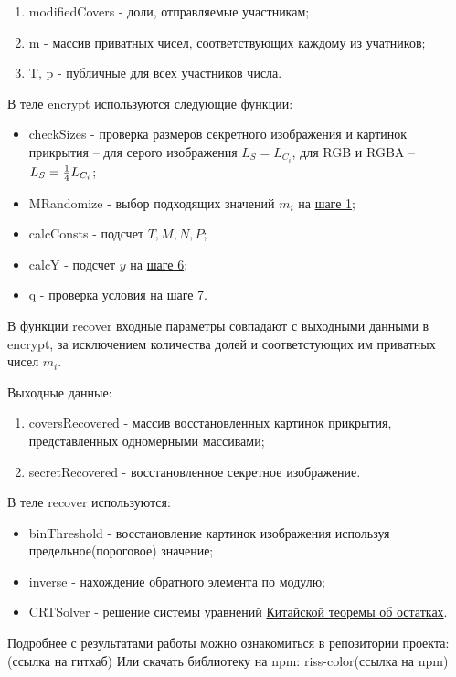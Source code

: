 \documentclass[a4paper,article,14pt]{extarticle}
\begin{document}
\begin{enumerate}[leftmargin=2cm]
    \item modifiedCovers - доли, отправляемые участникам;
    \item m - массив приватных чисел, соответствующих каждому из учатников;
    \item T, p - публичные для всех участников числа.
\end{enumerate}

В теле encrypt используются следующие функции: 
\begin{itemize}
    \setlength{\itemindent}{2em}
    \item checkSizes - проверка размеров секретного изображения и картинок прикрытия -- для серого изображения $L_S=L_{C_i}$,
    для RGB и RGBA -- $L_S={1\over 4}L_{C_i}$;
    \item MRandomize - выбор подходящих значений $m_i$ на \hyperlink{generation_alg}{шаге 1};
    \item calcConsts - подсчет $T, M, N, P$;
    \item calcY - подсчет $y$ на \hyperlink{step6_1}{шаге 6};
    \item q - проверка условия на \hyperlink{step6_1}{шаге 7}.
\end{itemize}

В функции recover входные параметры совпадают с выходными данными в encrypt, за исключением количества долей и соответстующих им 
приватных чисел $m_i$.

Выходные данные:
\begin{enumerate}
    \item coversRecovered - массив восстановленных картинок прикрытия, представленных одномерными массивами;
    \item secretRecovered - восстановленное секретное изображение.
\end{enumerate}

В теле recover используются: 
\begin{itemize}
    \item binThreshold - восстановление картинок изображения используя предельное(пороговое) значение;
    \item inverse - нахождение обратного элемента по модулю;
    \item CRTSolver - решение системы уравнений \hyperlink{CRTSolve}{Китайской теоремы об остатках}.
\end{itemize}

Подробнее с результатами работы можно ознакомиться в репозитории проекта: (ссылка на гитхаб) 
Или скачать библиотеку на npm: \flqq riss-color\frqq (ссылка на npm)
\end{document}

